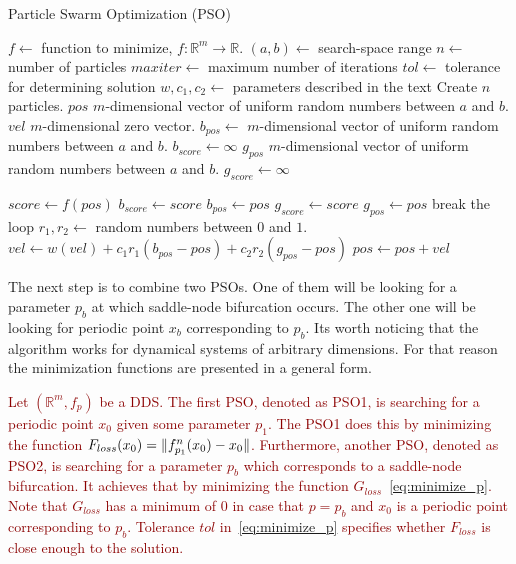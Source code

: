 \begin{algorithm}[!h]
    \caption{Particle Swarm Optimization (PSO)}
    \label{alg:pso}
    \begin{algorithmic}[1]
        \Statex $f \gets$ function to minimize, $f: \mathbb{R}^{m} \rightarrow \mathbb{R}$.
        \Statex $(a, b) \gets$ search-space range
        \Statex $n \gets$ number of particles
        \Statex $maxiter \gets$ maximum number of iterations
        \Statex $tol \gets$ tolerance for determining solution
        \Statex $w, c_{1}, c_{2} \gets$ parameters described in the text
        \State Create $n$ particles.
            \State $pos$ $m$-dimensional vector of uniform random numbers between $a$ and $b$.
            \State $vel$ $m$-dimensional zero vector.
            \State $b_{pos} \gets$ $m$-dimensional vector of uniform random numbers between $a$ and $b$.
            \State $b_{score} \gets \infty$
        \EndFor
        \State $g_{pos}$ $m$-dimensional vector of uniform random numbers between $a$ and $b$.
        \State $g_{score} \gets \infty$

                \State $score \gets f(pos)$ 
                    \State $b_{score} \gets score$
                    \State $b_{pos} \gets pos$
                \EndIf
                    \State $g_{score} \gets score$
                    \State $g_{pos} \gets pos$
                \EndIf
            \EndFor
                \State break the loop
            \EndIf
                \State $r_{1}, r_{2} \gets$ random numbers between $0$ and $1$.
                \State $vel \gets w(vel) + c_{1}r_{1}(b_{pos}-pos) + c_{2}r_{2}(g_{pos}-pos)$
                \State $pos \gets pos + vel$
            \EndFor
        \EndFor
    \end{algorithmic}
\end{algorithm}

\par
The next step is to combine two PSOs.
One of them will be looking for a parameter $p_b$ at which saddle-node bifurcation occurs.
The other one will be looking for periodic point $x_b$ corresponding to $p_b$.
Its worth noticing that the algorithm works for dynamical systems of arbitrary dimensions.
For that reason the minimization functions are presented in a general form.
\par
\textcolor{darkred}{
Let $(\mathbb{R}^{m}, f_{p})$ be a DDS.
The first PSO, denoted as PSO1, is searching for a periodic point $x_0$ given some parameter $p_{1}$.
The PSO1 does this by minimizing the function $F_{loss}(x_0) = \lVert f^{n}_{p_{1}}(x_0)-x_0\rVert$.
Furthermore, another PSO, denoted as PSO2, is searching for a parameter $p_{b}$ which corresponds to a saddle-node bifurcation.
It achieves that by minimizing the function $G_{loss}$~\eqref{eq:minimize_p}.
Note that $G_{loss}$ has a minimum of $0$ in case that $p = p_{b}$ and $x_{0}$ is a periodic point corresponding to $p_{b}$.
Tolerance $tol$ in~\eqref{eq:minimize_p} specifies whether $F_{loss}$ is close enough to the solution.
}

